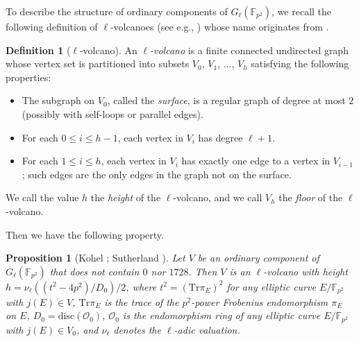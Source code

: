 \documentclass{article}
\newtheorem{proposition}[theorem]{Proposition}
\theoremstyle{definition}
\newtheorem{definition}[theorem]{Definition}
\newcommand{\FF}{\mathbb{F}}
\begin{document}
To describe the structure of ordinary components of $G_{\ell}(\FF_{p^2})$, we recall the following definition of $\ell$-volcanoes (see e.g., \cite{Sutherland:ANTSX}) whose name originates from \cite{DBLP:conf/ants/FouquetM02}.

\begin{definition}
[$\ell$-volcano]
\label{defn:volcano}
An \emph{$\ell$-volcano} is a finite connected undirected graph whose vertex set is partitioned into subsets $V_0$, $V_1$, $\dots$, $V_h$ satisfying the following properties:
\begin{itemize}
\item
The subgraph on $V_0$, called the \emph{surface}, is a regular graph of degree at most $2$ (possibly with self-loops or parallel edges).
\item
For each $0 \leq i \leq h-1$, each vertex in $V_i$ has degree $\ell + 1$.
\item
For each $1 \leq i \leq h$, each vertex in $V_i$ has exactly one edge to a vertex in $V_{i-1}$; such edges are the only edges in the graph not on the surface.
\end{itemize}
We call the value $h$ the \emph{height} of the $\ell$-volcano, and we call $V_h$ the \emph{floor} of the $\ell$-volcano.
\end{definition}

Then we have the following property.

\begin{proposition}
[{Kohel \cite{Kohel:thesis}; Sutherland \cite[Theorem 7]{Sutherland:ANTSX}}]
\label{prop:volcano_graph}
Let $V$ be an ordinary component of $G_{\ell}(\FF_{p^2})$ that does not contain $0$ nor $1728$.
Then $V$ is an $\ell$-volcano with height $h = \nu_{\ell}((t^2 - 4p^2) / D_0) / 2$, where $t^2 = (\mathrm{Tr} \pi_E)^2$ for any elliptic curve $E/\FF_{p^2}$ with $j(E) \in V$, $\mathrm{Tr} \pi_E$ is the trace of the $p^2$-power Frobenius endomorphism $\pi_E$ on $E$, $D_0 = \mathrm{disc}(\mathcal{O}_0)$, $\mathcal{O}_0$ is the endomorphism ring of any elliptic curve $E/\FF_{p^2}$ with $j(E) \in V_0$, and $\nu_{\ell}$ denotes the $\ell$-adic valuation.
\end{proposition}
\end{document}
